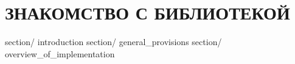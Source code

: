 \part{ЗНАКОМСТВО С БИБЛИОТЕКОЙ}\label{logic:bibl}
		{section/}	{introduction}						%
		{section/}	{general_provisions}				%
		{section/}	{overview_of_implementation}		%
